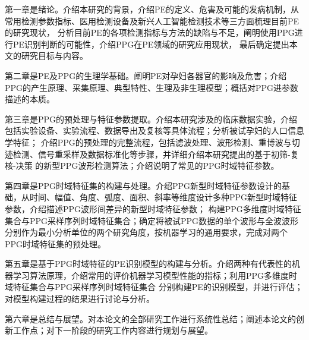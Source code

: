 第一章是绪论。介绍本研究的背景，介绍PE的定义、危害及可能的发病机制，从常用检测参数指标、医用检测设备及新兴人工智能检测技术等三方面梳理目前PE的研究现状，
分析目前PE的各项检测指标与方法的缺陷与不足，阐明使用PPG进行PE识别判断的可能性，介绍PPG在PE领域的研究应用现状，
最后确定提出本文的研究目标与内容。

第二章是PE及PPG的生理学基础。阐明PE对孕妇各器官的影响及危害；介绍PPG的产生原理、采集原理、典型特性、生理及非生理模型；概括对PPG进参数描述的本质。

第三章是PPG的预处理与特征参数提取。介绍本研究涉及的临床数据实验，介绍包括实验设备、实验流程、数据导出及复核等具体流程；分析被试孕妇的人口信息学特征；
介绍PPG的预处理的完整流程，包括滤波处理、波形检测、重博波与切迹检测、信号重采样及数据标准化等步骤，并详细介绍本研究提出的基于初筛-复核-决策
的新型PPG波形检测算法；介绍说明了常见的PPG时域特征参数。

第四章是PPG时域特征集的构建与处理。介绍PPG新型时域特征参数设计的基础，从时间、幅值、角度、弧度、面积、斜率等维度设计多种PPG新型时域特征参数，介绍描述PPG波形间差异的新型时域特征参数；
构建PPG多维度时域特征集合与PPG采样序列时域特征集合；确定将被试PPG数据的单个波形与全波波形分别作为最小分析单位的两个研究角度，按机器学习的通用要求，完成对两个PPG时域特征集的预处理。

第五章是基于PPG时域特征的PE识别模型的构建与分析。介绍两种有代表性的机器学习算法原理，介绍常用的评价机器学习模型性能的指标；利用PPG多维度时域特征集合与PPG采样序列时域特征集合
分别构建PE的识别模型，并进行评估；对模型构建过程的结果进行讨论与分析。

第六章是总结与展望。对本论文的全部研究工作进行系统性总结；阐述本论文的创新工作点；对下一阶段的研究工作内容进行规划与展望。